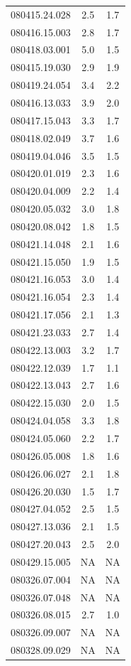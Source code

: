 \documentclass[draft]{agujournal2019}
\begin{document}
\begin{table}[hbt!]
\begin{tabular}{c c c}
080415.24.028 & 2.5 & 1.7 \\
080416.15.003 & 2.8 & 1.7 \\
080418.03.001 & 5.0 & 1.5 \\
080415.19.030 & 2.9 & 1.9 \\
080419.24.054 & 3.4 & 2.2 \\
080416.13.033 & 3.9 & 2.0 \\
080417.15.043 & 3.3 & 1.7 \\
080418.02.049 & 3.7 & 1.6 \\
080419.04.046 & 3.5 & 1.5 \\
080420.01.019 & 2.3 & 1.6 \\
080420.04.009 & 2.2 & 1.4 \\
080420.05.032 & 3.0 & 1.8 \\
080420.08.042 & 1.8 & 1.5 \\
080421.14.048 & 2.1 & 1.6 \\
080421.15.050 & 1.9 & 1.5 \\
080421.16.053 & 3.0 & 1.4 \\
080421.16.054 & 2.3 & 1.4 \\
080421.17.056 & 2.1 & 1.3 \\
080421.23.033 & 2.7 & 1.4 \\
080422.13.003 & 3.2 & 1.7 \\
080422.12.039 & 1.7 & 1.1 \\
080422.13.043 & 2.7 & 1.6 \\
080422.15.030 & 2.0 & 1.5 \\
080424.04.058 & 3.3 & 1.8 \\
080424.05.060 & 2.2 & 1.7 \\
080426.05.008 & 1.8 & 1.6 \\
080426.06.027 & 2.1 & 1.8 \\
080426.20.030 & 1.5 & 1.7 \\
080427.04.052 & 2.5 & 1.5 \\
080427.13.036 & 2.1 & 1.5 \\
080427.20.043 & 2.5 & 2.0 \\
080429.15.005 & NA & NA \\
080326.07.004 & NA & NA \\
080326.07.048 & NA & NA \\
080326.08.015 & 2.7 & 1.0 \\
080326.09.007 & NA & NA \\
080328.09.029 & NA & NA \\
\hline
\end{tabular}
\end{table}
\end{document}
